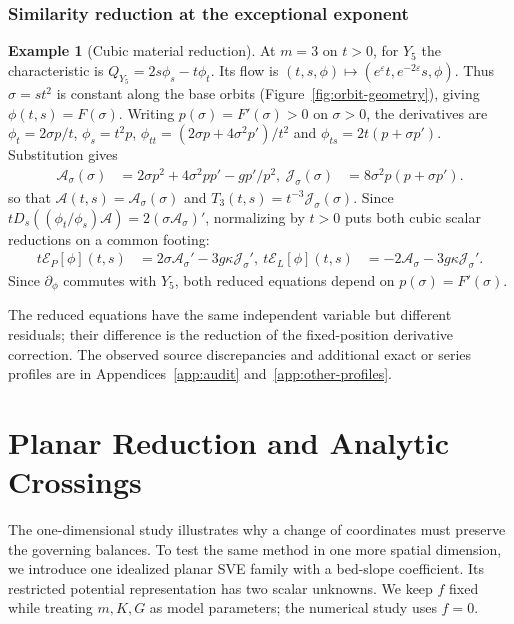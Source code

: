 \documentclass[12pt,a4paper,oneside]{report}
\numberwithin{equation}{chapter}
\theoremstyle{definition}
\newtheorem{example}[theorem]{Example}
\theoremstyle{remark}\newtheorem{remark}[theorem]{Remark}
\newif\ifreviewmarks
\DeclareRobustCommand{\review}[1]{{\ifreviewmarks\color{authorblue}\fi #1}}
\begin{document}
\subsection{Similarity reduction at the exceptional exponent}\label{sec:reductions}
\begin{example}[Cubic material reduction]\label{ex:y5}
At $m=3$ on $t>0$, for $Y_5$ the characteristic is $Q_{Y_5}=2s\phi_s-t\phi_t$. Its flow is $(t,s,\phi)\mapsto(e^\varepsilon t,e^{-2\varepsilon}s,\phi)$. Thus $\sigma=st^2$ is constant along the base orbits (Figure~\ref{fig:orbit-geometry}), giving $\phi(t,s)=F(\sigma)$.
Writing $p(\sigma)=F'(\sigma)>0$ on $\sigma>0$, the derivatives are $\phi_t=2\sigma p/t$, $\phi_s=t^2p$, $\phi_{tt}=(2\sigma p+4\sigma^2p')/t^2$ and $\phi_{ts}=2t(p+\sigma p')$. Substitution gives
\begin{equation}\label{eq:cubic-terms}
 \begin{aligned}
 \mathcal A_\sigma(\sigma)&=2\sigma p^2+4\sigma^2pp'-gp'/p^2,\
 \mathcal J_\sigma(\sigma)&=8\sigma^2 p(p+\sigma p').
 \end{aligned}
\end{equation}
so that $\mathcal A(t,s)=\mathcal A_\sigma(\sigma)$ and $T_3(t,s)=t^{-3}\mathcal J_\sigma(\sigma)$. Since $tD_s((\phi_t/\phi_s)\mathcal A)=2(\sigma\mathcal A_\sigma)'$, normalizing by $t>0$ puts both cubic scalar reductions on a common footing:
\begin{equation}\label{eq:cubic-reduced}
 \begin{aligned}
 t\mathcal E_{P}[\phi](t,s)&=2\sigma\mathcal A_\sigma'-3g\kappa\mathcal J_\sigma',\
 t\mathcal E_{L}[\phi](t,s)&=-2\mathcal A_\sigma-3g\kappa\mathcal J_\sigma'.
 \end{aligned}
\end{equation}
Since $\partial_\phi$ commutes with $Y_5$, both reduced equations depend on $p(\sigma)=F'(\sigma)$.
\end{example}


\review{The reduced equations have the same independent variable but different residuals; their difference is the reduction of the fixed-position derivative correction. The observed source discrepancies and additional exact or series profiles are in Appendices~\ref{app:audit} and~\ref{app:other-profiles}.}
\FloatBarrier

\chapter{Planar Reduction and Analytic Crossings}\label{ch:continuation}
\review{The one-dimensional study illustrates why a change of coordinates must preserve the governing balances. To test the same method in one more spatial dimension, we introduce one idealized planar SVE family with a bed-slope coefficient. Its restricted potential representation has two scalar unknowns. We keep $f$ fixed while treating $m,K,G$ as model parameters; the numerical study uses $f=0$.}
\end{document}

